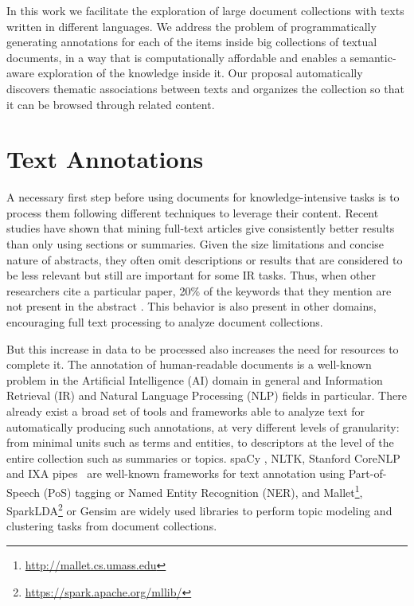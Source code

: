 In this work we facilitate the exploration of large document collections with texts written in different languages. We address the problem of programmatically generating annotations for each of the items inside big collections of textual documents, in a way that is computationally affordable and enables a semantic-aware exploration of the knowledge inside it. Our proposal automatically discovers thematic associations between texts and organizes the collection so that it can be browsed through related content.





\section{Text Annotations}

A necessary first step before using documents for knowledge-intensive tasks is to process them following different techniques to leverage their content. Recent studies \cite{Westergaard2017}\cite{Sciences2016} have shown that mining full-text articles give consistently better results than only using sections or summaries. Given the size limitations and concise nature of abstracts, they often omit descriptions or results that are considered to be less relevant but still are important for some IR tasks. Thus, when other researchers cite a particular paper, 20\% of the keywords that they mention are not present in the abstract \cite{Divoli2012}. This behavior is also present in other domains, encouraging full text processing to analyze document collections.

But this increase in data to be processed also increases the need for resources to complete it. The annotation of human-readable documents is a well-known problem in the Artificial Intelligence (AI) domain in general and Information Retrieval (IR) and Natural Language Processing (NLP) fields in particular. There already exist a broad set of tools and frameworks able to analyze text for automatically producing such annotations, at very different levels of granularity: from minimal units such as terms and entities, to descriptors at the level of the entire collection such as  summaries or topics. spaCy , NLTK, Stanford CoreNLP~\cite{Manning2014TheToolkit} and IXA pipes~\cite{Agerri2014} are well-known frameworks for text annotation using Part-of-Speech (PoS) tagging or Named Entity Recognition (NER), and  Mallet\footnote{\url{http://mallet.cs.umass.edu}},  SparkLDA\footnote{\url{https://spark.apache.org/mllib/}} or Gensim are widely used libraries to perform topic modeling and clustering tasks from document collections. 


